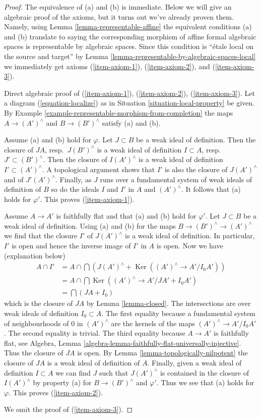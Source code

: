 \documentclass{stacks-project}
\theoremstyle{plain}
\theoremstyle{definition}
\theoremstyle{remark}
\numberwithin{equation}{subsection}
\def\Ker{\mathop{\mathrm{Ker}}}
\begin{document}
\begin{proof}
The equivalence of (a) and (b) is immediate. Below we will give an
algebraic proof of the axioms, but it turns out we've already proven
them. Namely, using Lemma \ref{lemma-representable-affine}
the equivalent conditions (a) and (b) translate to saying the
corresponding morphism of affine formal algebraic spaces is representable
by algebraic spaces.
Since this condition is ``\'etale local on the source and target'' by
Lemma \ref{lemma-representable-by-algebraic-spaces-local}
we immediately get axioms (\ref{item-axiom-1}), (\ref{item-axiom-2}), and
(\ref{item-axiom-3}).

\medskip\noindent
Direct algebraic proof of (\ref{item-axiom-1}), (\ref{item-axiom-2}),
(\ref{item-axiom-3}). Let a diagram (\ref{equation-localize}) as in
Situation \ref{situation-local-property} be given.
By Example \ref{example-representable-morphism-from-completion}
the maps $A \to (A')^\wedge$ and $B \to (B')^\wedge$
satisfy (a) and (b).

\medskip\noindent
Assume (a) and (b) hold for $\varphi$. Let $J \subset B$ be a weak ideal
of definition. Then the closure of $JA$, resp.\ $J(B')^\wedge$
is a weak ideal of definition $I \subset A$, resp.\ $J' \subset (B')^\wedge$.
Then the closure of $I(A')^\wedge$ is a weak ideal of definition
$I' \subset (A')^\wedge$. A topological argument shows that $I'$ is also
the closure of $J(A')^\wedge$ and of $J'(A')^\wedge$.
Finally, as $J$ runs over a fundamental system of weak ideals of definition
of $B$ so do the ideals $I$ and $I'$ in $A$ and $(A')^\wedge$.
It follows that (a) holds for $\varphi'$. This proves (\ref{item-axiom-1}).

\medskip\noindent
Assume $A \to A'$ is faithfully flat and that (a) and (b) hold for $\varphi'$.
Let $J \subset B$ be a weak ideal of definition. Using (a) and (b)
for the maps $B \to (B')^\wedge \to (A')^\wedge$ we find that the
closure $I'$ of $J(A')^\wedge$ is a weak ideal of definition.
In particular, $I'$ is open and hence the inverse image of $I'$
in $A$ is open. Now we have (explanation below)
\begin{align*}
A \cap I'
& =
A \cap \bigcap (J(A')^\wedge + \Ker((A')^\wedge \to A'/I_0A')) \\
& =
A \cap \bigcap \Ker((A')^\wedge \to A'/JA' + I_0 A') \\
& = \bigcap (JA + I_0)
\end{align*}
which is the closure of $JA$ by Lemma \ref{lemma-closed}.
The intersections are over weak ideals of definition $I_0 \subset A$.
The first equality because a fundamental system of neighbourhoods of
$0$ in $(A')^\wedge$ are the kernels of the maps $(A')^\wedge \to A'/I_0A'$.
The second equality is trivial. The third equality because $A \to A'$
is faithfully flat, see
Algebra, Lemma \ref{algebra-lemma-faithfully-flat-universally-injective}.
Thus the closure of $JA$ is open. By Lemma \ref{lemma-topologically-nilpotent}
the closure of $JA$
is a weak ideal of definition of $A$. Finally, given a weak
ideal of definition $I \subset A$ we can find $J$ such that
$J(A')^\wedge$ is contained in the closure of $I(A')^\wedge$
by property (a) for $B \to (B')^\wedge$ and $\varphi'$.
Thus we see that (a) holds for $\varphi$. This proves (\ref{item-axiom-2}).

\medskip\noindent
We omit the proof of (\ref{item-axiom-3}).
\end{proof}
\end{document}
